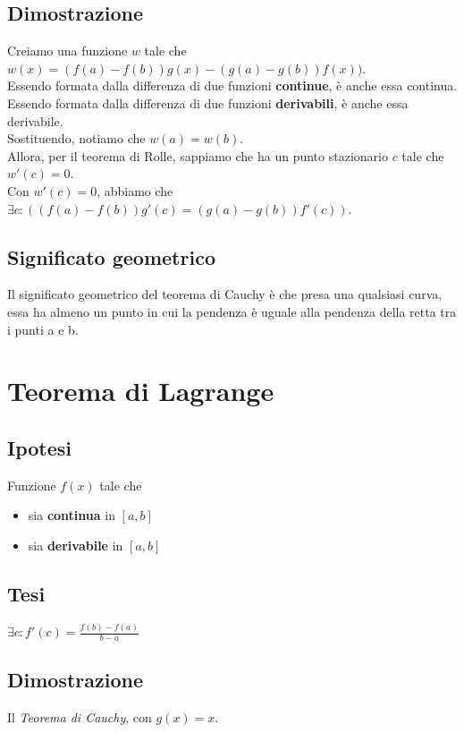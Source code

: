 \documentclass{article}
\begin{document}
\subsection{Dimostrazione}
Creiamo una funzione \(w\) tale che \(w(x) = (f(a) - f(b))g(x) - (g(a) - g(b))f(x))\).\\
Essendo formata dalla differenza di due funzioni \textbf{continue}, è anche essa continua.\\
Essendo formata dalla differenza di due funzioni \textbf{derivabili}, è anche essa derivabile.\\
Sostituendo, notiamo che \(w(a) = w(b)\).\\
Allora, per il teorema di Rolle, sappiamo che ha un punto stazionario \(c\) tale che \(w'(c) = 0\).\\
Con \(w'(c) = 0\), abbiamo che \(\exists c : ((f(a) - f(b))g'(c) = (g(a) - g(b))f'(c))\).

\subsection{Significato geometrico}
Il significato geometrico del teorema di Cauchy è che presa una qualsiasi curva, essa ha almeno un punto in cui la pendenza è uguale alla pendenza della retta tra i punti a e b.

\newpage

\section{Teorema di Lagrange}

\begin{multicols}{2}
    \subsection{Ipotesi}
    Funzione \(f(x)\) tale che
    \begin{itemize}
        \item sia \textbf{continua} in \([a, b]\)
        \item sia \textbf{derivabile} in \([a, b]\)
    \end{itemize}
\columnbreak
    \subsection{Tesi}
    \(\exists c : f'(c) = \frac{f(b) - f(a)}{b - a}\)
\end{multicols}

\subsection{Dimostrazione}
Il \textit{Teorema di Cauchy}, con \(g(x) = x\).
\end{document}
